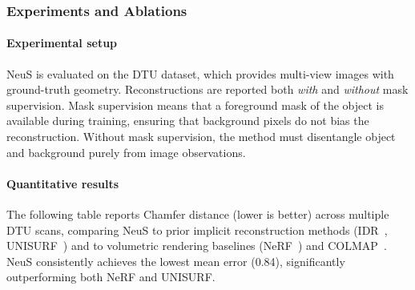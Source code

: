 \begin{enrichment}
\begin{enrichment}
        \subsubsection{Experiments and Ablations}
        \label{subsec:chapter23_neus_experiments}
        
        \paragraph{Experimental setup}  
        NeuS is evaluated on the DTU dataset, which provides multi-view images with ground-truth geometry. Reconstructions are reported both \emph{with} and \emph{without} mask supervision. Mask supervision means that a foreground mask of the object is available during training, ensuring that background pixels do not bias the reconstruction. Without mask supervision, the method must disentangle object and background purely from image observations.
        
        \paragraph{Quantitative results}  
        The following table reports Chamfer distance (lower is better) across multiple DTU scans, comparing NeuS to prior implicit reconstruction methods (IDR~\cite{yariv2020_idr}, UNISURF~\cite{oechsle2021_unisurf}) and to volumetric rendering baselines (NeRF~\cite{mildenhall2020_nerf}) and COLMAP~\cite{schonberger2016_structure}. NeuS consistently achieves the lowest mean error (0.84), significantly outperforming both NeRF and UNISURF.
        

\end{enrichment}
\end{enrichment}
